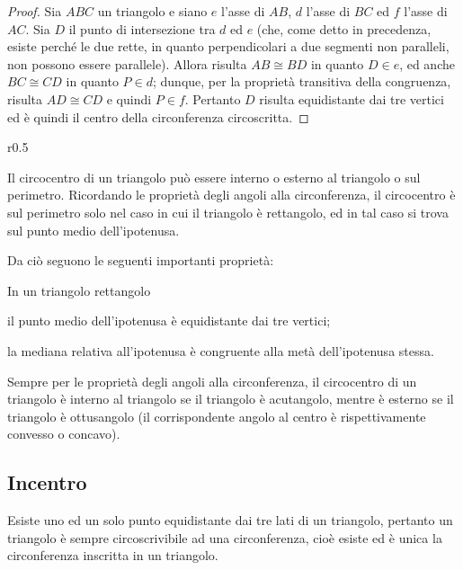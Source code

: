 \begin{figure}[htb]
	\centering
\end{figure}
\begin{proof}
Sia $ABC$ un triangolo e siano $e$ l'asse di $AB$, $d$ l'asse di $BC$ ed $f$ l'asse di $AC$. Sia $D$ il punto di intersezione tra $d$ ed $e$ (che, come detto in precedenza, esiste perché le due rette, in quanto perpendicolari a due segmenti non paralleli, non possono essere parallele). Allora risulta $AB\cong BD$ in quanto $D\in e$, ed anche $BC\cong CD$ in quanto $P\in d$; dunque, per la proprietà transitiva della congruenza, risulta $AD\cong CD$ e quindi $P\in f$. Pertanto $D$ risulta equidistante dai tre vertici ed è quindi il centro della circonferenza circoscritta.
\end{proof}

\begin{wrapfigure}{r}{0.5\textwidth}
	\centering
\end{wrapfigure}
\osservazione Il circocentro di un triangolo può essere interno o esterno al triangolo o sul perimetro. Ricordando le proprietà degli angoli alla circonferenza, il circocentro è sul perimetro solo nel caso in cui il triangolo è rettangolo, ed in tal caso si trova sul punto medio dell'ipotenusa.

Da ciò seguono le seguenti importanti proprietà:
\begin{teorema}
In un triangolo rettangolo
\begin{itemize*}
\item il punto medio dell'ipotenusa è equidistante dai tre vertici;
\item la mediana relativa all'ipotenusa è congruente alla metà dell'ipotenusa stessa.
\end{itemize*}
\end{teorema}

Sempre per le proprietà degli angoli alla circonferenza, il circocentro di un triangolo è interno al triangolo se il triangolo è acutangolo, mentre è esterno se il triangolo è ottusangolo (il corrispondente angolo al centro è rispettivamente convesso o concavo).

\subsection{Incentro}

Esiste uno ed un solo punto equidistante dai tre lati di un triangolo, pertanto un triangolo è sempre circoscrivibile ad una circonferenza, cioè esiste ed è unica la circonferenza inscritta in un triangolo.

